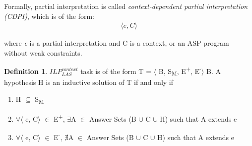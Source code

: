 \documentclass[12pt,twoside]{report}
\theoremstyle{plain}
\theoremstyle{definition}
\newtheorem{defn}[thm]{Definition} %
\begin{document}
Formally, partial interpretation is called \textit{context-dependent partial interpretation (CDPI)}, which is of the form:
\begin{equation} \label{eq:cdpi}
\begin{split}
\langle e, C \rangle
\end{split}
\end{equation}


 where \textit{e} is a partial interpretation and C is a context, or an ASP program without weak constraints.


%
\begin{defn} \label{def:las_context}
$ILP_{LAS}^{context}$ task is of the form T = $\langle$ B, S\textsubscript{M}, E\textsuperscript{+}, E\textsuperscript{-}$\rangle$ B.
A hypothesis H is an inductive solution of T if and only if
\begin{enumerate}
\item H $\subseteq$ S\textsubscript{M}
\item $\forall$$\langle$ e, C$\rangle$ $\in$ E\textsuperscript{+}, $\exists$A $\in$ Answer Sets (B $\cup$ C $\cup$ H) such that A extends e
\item $\forall$$\langle$ e, C$\rangle$ $\in$ E\textsuperscript{-}, $\nexists$A $\in$ Answer Sets (B $\cup$ C $\cup$ H) such that A extends e
\end{enumerate}
\end{defn}
\end{document}
